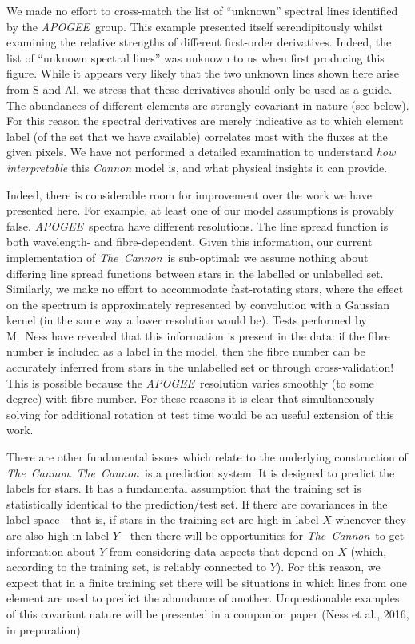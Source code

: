 \documentclass[12pt,preprint]{aastex}
\newcommand{\project}[1]{\textsl{#1}}
\newcommand{\TheCannon}{\project{The~Cannon}}
\newcommand{\tc}{\TheCannon}
\newcommand{\acronym}[1]{{\small{#1}}}
\newcommand{\apogee}{\project{\acronym{APOGEE}}}
\begin{document}
We made no effort to cross-match the list of ``unknown'' spectral lines
identified by the \apogee\ group.  This example presented itself
serendipitously whilst examining the relative strengths of different
first-order derivatives.  Indeed, the list of ``unknown spectral lines''
was unknown to us when first producing this figure.  While it appears
very likely that the two unknown lines shown here arise from S and Al,
we stress that these derivatives should only be used as a guide.  The
abundances of different elements are strongly covariant in nature (see below).
For this reason the spectral derivatives are merely indicative as to
which element label (of the set that we have available) correlates
most with the fluxes at the given pixels.  We have not performed
a detailed examination to understand \emph{how interpretable} this
\emph{Cannon} model is, and what physical insights it can provide.


Indeed, there is considerable room for improvement over the work
we have presented here.  For example, at least one of our model 
assumptions is provably false. \apogee\ spectra have
different resolutions.  The line spread function is both wavelength- and 
fibre-dependent.  Given this information, our current implementation of \tc\ is  
sub-optimal: we assume nothing about differing line spread functions between 
stars in the labelled or unlabelled set.  Similarly, we make no effort to 
accommodate fast-rotating stars, where the effect on the spectrum is 
approximately represented by convolution with a Gaussian kernel (in the same way
a lower resolution would be).  Tests performed by M.~Ness have revealed that 
this information is present in the data: if the fibre number is included as a
label in the model, then the fibre number can be accurately inferred from stars
in the unlabelled set or through cross-validation!  This is possible because the 
\apogee\ resolution varies smoothly (to some degree) with fibre number.  For 
these reasons it is clear that simultaneously solving for additional rotation
at test time would be an useful extension of this work.  


There are other fundamental issues which relate to the underlying construction
of \TheCannon.  \TheCannon\ is a prediction system: It is designed to predict
the labels for stars.  It has a fundamental assumption that the training set
is statistically identical to the prediction/test set.  If there are covariances
in the label space---that is, if stars in the training set are high in label $X$ whenever
they are also high in label $Y$---then there will be opportunities for 
\TheCannon\ to get information about $Y$ from considering data aspects that 
depend on $X$ (which, according to the training set, is reliably connected to 
$Y$).  For this reason, we expect that in a finite training set there will
be situations in which lines from one element are used to predict the abundance
of another.  Unquestionable examples of this covariant nature will be presented
in a companion paper (Ness et al., 2016, in preparation).  %
\end{document}
